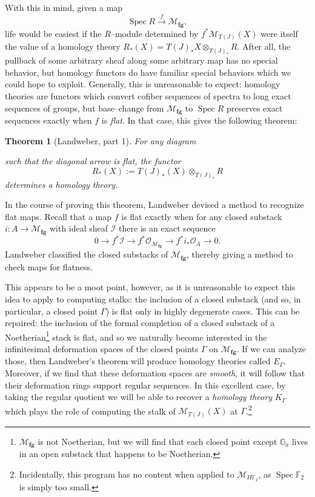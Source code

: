 \documentclass{amsart}
\newcommand{\F}{\mathbb F}
\newcommand{\G}{\mathbb G}
\newcommand{\M}{\mathcal{M}}
\newcommand{\<}{\langle}
\renewcommand{\>}{\rangle}
\newcommand{\moduli}[1]{\mathcal{M}_{\mathbf{#1}}}
\DeclareMathOperator{\Spec}{Spec}
\theoremstyle{plain}
\newtheorem*{theorem}{Theorem}
\theoremstyle{definition}
\theoremstyle{remark}
\begin{document}
With this in mind, given a map \[\Spec R \xrightarrow{f} \moduli{fg},\] life would be easiest if the $R$--module determined by $f^* \M_{T(J)}(X)$ were itself the value of a homology theory $R_*(X) = T(J)_* X \otimes_{T(J)_*} R$.  After all, the pullback of some arbitrary sheaf along some arbitrary map has no special behavior, but homology functors do have familiar special behaviors which we could hope to exploit.  Generally, this is unreasonable to expect: homology theories are functors which convert cofiber sequences of spectra to long exact sequences of groups, but base--change from $\moduli{fg}$ to $\Spec R$ preserves exact sequences exactly when $f$ is \textit{flat}.  In that case, this gives the following theorem:

\begin{theorem}[Landweber, part 1]
For any diagram
\begin{center}
\end{center}
such that the diagonal arrow is flat, the functor \[R_*(X) := T(J)_*(X) \otimes_{T(J)_*} R\] determines a homology theory. 
\end{theorem}

\noindent In the course of proving this theorem, Landweber devised a method to recognize flat maps.  Recall that a map $f$ is flat exactly when for any closed substack $i: A \to \moduli{fg}$ with ideal sheaf $\mathcal I$ there is an exact sequence \[0 \to f^* \mathcal I \to f^* \mathcal O_{\moduli{fg}} \to f^* i_* \mathcal O_A \to 0.\]  Landweber classified the closed substacks of $\moduli{fg}$, thereby giving a method to check maps for flatness.

This appears to be a moot point, however, as it is unreasonable to expect this idea to apply to computing stalks: the inclusion of a closed substack (and so, in particular, a closed point $\Gamma$) is flat only in highly degenerate cases.  This can be repaired: the inclusion of the formal completion of a closed substack of a Noetherian\footnote{$\moduli{fg}$ is not Noetherian, but we will find that each closed point except $\G_a$ lives in an open substack that happens to be Noetherian.} stack is flat, and so we naturally become interested in the infinitesimal deformation spaces of the closed points $\Gamma$ on $\moduli{fg}$.  If we can analyze those, then Landweber's theorem will produce homology theories called $E_\Gamma$.  Moreover, if we find that these deformation spaces are \emph{smooth}, it will follow that their deformation rings support regular sequences.  In this excellent case, by taking the regular quotient we will be able to recover a \emph{homology theory} $K_\Gamma$ which plays the role of computing the stalk of $\M_{T(J)}(X)$ at $\Gamma$.\footnote{Incidentally, this program has no content when applied to $\M_{H\F_2}$, as $\Spec \F_2$ is simply too small.}
\end{document}
